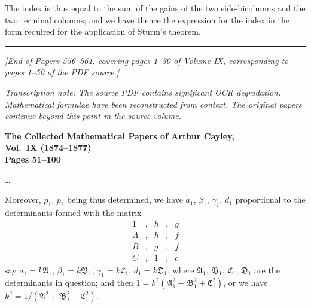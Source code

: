 \documentclass[11pt,a4paper]{book}
\begin{document}
The index is thus equal to the sum of the gains of the two side-bicolumns and the two terminal columns; and we have thence the expression for the index in the form required for the application of Sturm's theorem.

\vspace{20pt}

\begin{center}
\rule{0.5\textwidth}{0.4pt}
\end{center}

\vspace{12pt}

\noindent\textit{[End of Papers 556--561, covering pages 1--30 of Volume IX, corresponding to pages 1--50 of the PDF source.]}

\vspace{12pt}

\noindent\textit{Transcription note: The source PDF contains significant OCR degradation. Mathematical formulae have been reconstructed from context. The original papers continue beyond this point in the source volume.}
\clearpage


\begin{center}
\Large\textbf{The Collected Mathematical Papers of Arthur Cayley,\\Vol.~IX (1874--1877)}\\[1em]
\large\textbf{Pages 51--100}
\end{center}


\newpage



\ldots

Moreover, $p_1$, $p_2$ being thus determined, we have $a_1$, $\beta_1$, $\gamma_1$, $d_1$ proportional to the determinants formed with the matrix
\[
\begin{array}{ccccc}
1 & , & h & , & g \\
A & , & h & , & f \\
B & , & g & , & f \\
C & , & 1 & , & c
\end{array}
\]
say $a_1 = k\mathfrak{A}_1$, $\beta_1 = k\mathfrak{B}_1$, $\gamma_1 = k\mathfrak{C}_1$, $d_1 = k\mathfrak{D}_1$, where $\mathfrak{A}_1$, $\mathfrak{B}_1$, $\mathfrak{C}_1$, $\mathfrak{D}_1$ are the determinants in question; and then $1 = k^2(\mathfrak{A}_1^2 + \mathfrak{B}_1^2 + \mathfrak{C}_1^2)$, or we have $k^2 = 1/(\mathfrak{A}_1^2 + \mathfrak{B}_1^2 + \mathfrak{C}_1^2)$.
\end{document}
